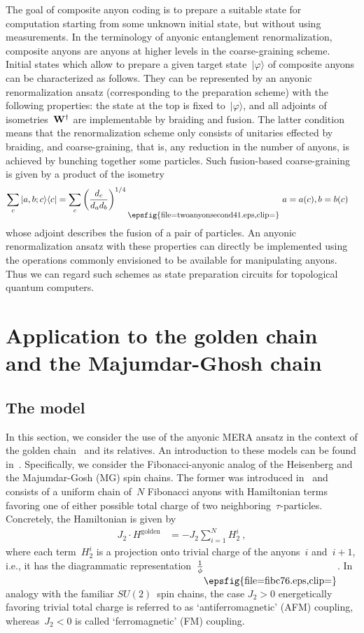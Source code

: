 \documentclass[floats,prb,twocolumn]{revtex4}
\newcommand*{\textfrac}[2]{{{#1}/{#2}}}
\newcommand{\ket}[1]{|#1\rangle}
\newcommand{\bra}[1]{\langle#1|}
\newcommand*{\Xisometry}{{\bf W}}
\newcommand*{\twoanyonsecond}{\raisebox{-19.305pt}{\epsfig{file=twoanyonsecond41.eps,clip=}}}
\newcommand*{\fibc}{\raisebox{-14.763pt}{\epsfig{file=fibc76.eps,clip=}}}
\begin{document}
 The goal of composite anyon coding is to prepare a suitable  state for computation starting from some unknown initial state, but without using measurements. In the terminology of anyonic entanglement renormalization, composite anyons are anyons at higher levels in the coarse-graining scheme.  Initial states which allow to prepare a given target state~$\ket{\varphi}$ of composite anyons can be characterized as follows. They can be represented by an anyonic renormalization ansatz (corresponding to the preparation scheme) with the following properties:  the state at the top is fixed to~$\ket{\varphi}$, and all adjoints of isometries~$\Xisometry^\dagger$ are implementable by braiding and fusion. The latter condition
 means that the renormalization scheme only consists of unitaries effected by braiding, and coarse-graining, that is, any reduction in the number of anyons, is achieved by bunching together some particles. Such fusion-based coarse-graining is given by a product of the isometry 
\begin{align*}
\sum_{c}\ket{a,b;c}\bra{c}&=\sum_{c}\left(\frac{d_c}{d_ad_b}\right)^{\textfrac{1}{4}}\scalebox{0.9}{\twoanyonsecond}\ a=a(c), b=b(c)
\end{align*}
whose adjoint describes the fusion of a pair of particles. An anyonic renormalization ansatz with these properties can  directly be implemented using the operations commonly envisioned to be  available for manipulating anyons. Thus we can regard such schemes as  state preparation circuits for  topological quantum computers.


\section{Application to the golden chain and the Majumdar-Ghosh chain\label{sec:goldenchain}}
\subsection{The model}
In this section, we consider the use of the anyonic MERA ansatz in the context of the golden chain~\cite{Feiguinetal07} and its relatives. An introduction to these models can be found in~\cite{Trebstetal08}. Specifically, we  consider the Fibonacci-anyonic analog of the Heisenberg and the Majumdar-Gosh (MG) spin chains.  The former was introduced in~\cite{Feiguinetal07} and consists of a uniform chain of~$N$ Fibonacci anyons with Hamiltonian terms favoring one of either possible total charge of two neighboring~$\tau$-particles. Concretely, the Hamiltonian is given by
\begin{align}
J_2\cdot H^{\textrm{golden}} &= -J_2 \sum_{i=1}^N H^i_2\ ,\label{eq:hgolden}
\end{align}
where each term~$H^i_2$ is a projection onto trivial charge of the anyons~$i$ and~$i+1$, i.e., it has the diagrammatic representation~$\frac{1}{\phi}\fibc$. In analogy with the familiar $SU(2)$~spin chains, the case $J_2>0$ energetically favoring trivial total charge is referred to as `antiferromagnetic' (AFM) coupling, whereas~$J_2<0$ is called `ferromagnetic' (FM) coupling. 
\end{document}
